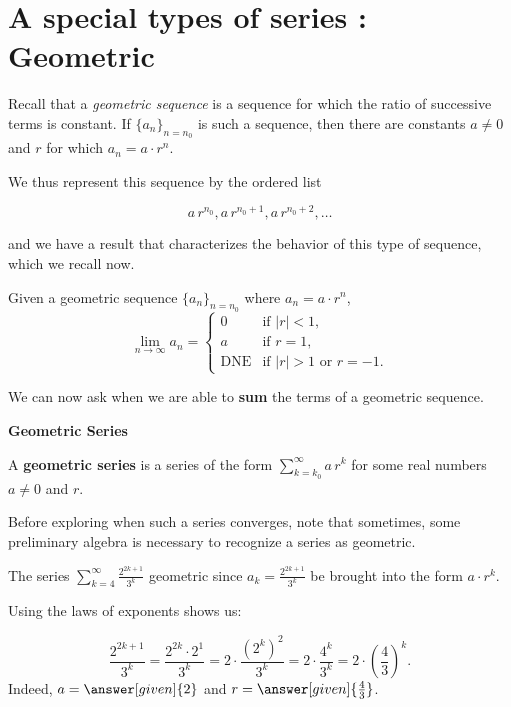 \documentclass{ximera}
\begin{document}
\section*{A special types of series : Geometric}



Recall that a \emph{geometric sequence} is a sequence for which the ratio of successive terms is constant.  If $\{a_n\}_{n=n_0}$ is such a sequence, then there are constants $a \ne 0$ and $r$ for which $a_n = a\cdot r^n$.  

We thus represent this sequence by the ordered list

\[
a \, r^{n_0} , a \, r^{n_0+1}, a \, r^{n_0+2}, \ldots
\]

and we have a result that characterizes the behavior of this type of sequence, which we recall now.


\begin{theorem}
  Given a geometric sequence $\{a_n\}_{n=n_0}$ where $a_n = a \cdot r^{n}$,
  \[
  \lim_{n\to\infty} a_n =
  \begin{cases}
    0 &\text{if $|r|<1$,}\\
    a &\text{if $r=1$,}\\
    \text{DNE} &\text{if $|r|>1$ or $r=-1$.}
  \end{cases}
  \]
\end{theorem}

We can now ask when we are able to \textbf{\textcolor{purple!85!blue}{sum}} the terms of a geometric sequence.

\begin{definition}  \textbf{\textcolor{green!50!black}{Geometric Series}} 


  A \textbf{geometric series} is a series of the form $\sum\limits_{k=k_0}^\infty a \, r^k$
  for some real numbers $a \ne 0$ and $r$.
\end{definition}

Before exploring when such a series converges, note that sometimes, some preliminary algebra is necessary to recognize a series as geometric.

\begin{example}
The series $\sum\limits_{k=4}^\infty \frac{2^{2k+1}}{3^k}$  geometric since $a_k =\frac{2^{2k+1}}{3^k}$  be brought into the form $a \cdot r^k$.  

Using the laws of exponents shows us:

\[
\frac{2^{2k+1}}{3^k} = \frac{2^{2k} \cdot 2^1}{3^k}= 2 \cdot \frac{\left(2^{k}\right)^2}{3^k} = 2 \cdot \frac{4^k}{3^k} = 2 \cdot \left(\frac{4}{3}\right)^k.
\]
Indeed, $a= \answer[given]{2}$ and $r = \answer[given]{\frac{4}{3}}$.
\end{example}
\end{document}

